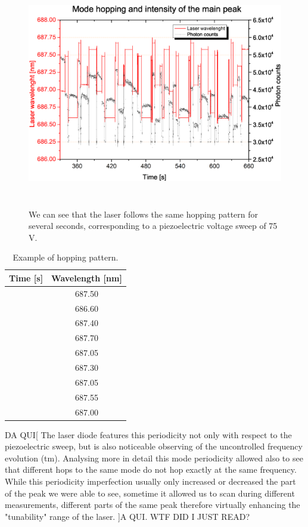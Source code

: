 \begin{figure}[!hbpt]\centering
\includegraphics[width=\linewidth, height=10cm, draft=\foto]{eps/periodicityofhops.eps}
\caption{We can see that the laser follows the same hopping pattern for several seconds, corresponding to a piezoelectric voltage sweep of 75 V.}
\label{hoppattern}
\end{figure}

\begin{table}[!hbpt]\centering
	\begin{tabular}{c|c}
		Time [s]&Wavelength [nm]\\
		\hline
		&687.50\\
		&686.60\\
		&687.40\\
		&687.70\\
		&687.05\\
		&687.30\\
		&687.05\\
		&687.55\\
		&687.00\\
		\hline
	\end{tabular}
\caption{Example of hopping pattern.}
\label{tabrutta}
\end{table}

DA QUI[
The laser diode features this periodicity not only with respect to the piezoelectric sweep, but is also noticeable observing of the uncontrolled frequency evolution (tm). 
Analysing more in detail this mode periodicity allowed also to see that different hops to the same mode do not hop exactly at the same frequency. While this periodicity imperfection usually only increased or decreased the part of the peak we were able to see, sometime it allowed us to scan during different measurements, different parts of the same peak therefore virtually enhancing the "tunability" range of the laser. ]A QUI. WTF DID I JUST READ?
 
